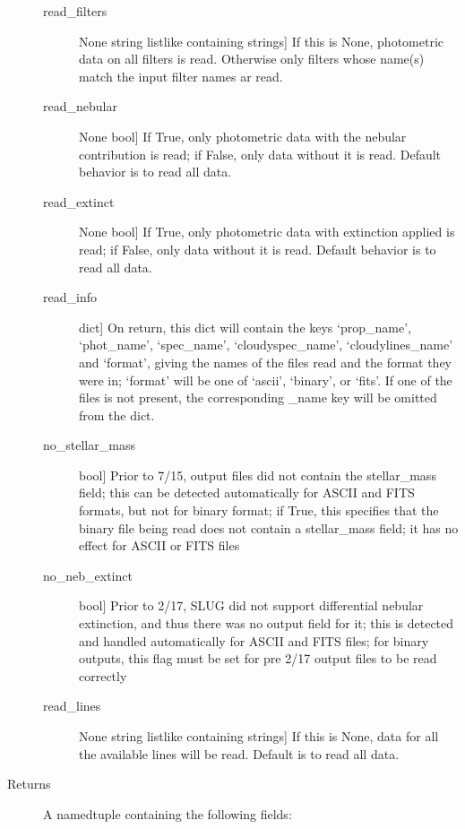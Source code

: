 \documentclass[letterpaper,10pt,english]{sphinxmanual}
\begin{document}
\begin{fulllineitems}
\begin{description}
\begin{description}
\item[{read\_filters}] \leavevmode{[}None \textbar{} string \textbar{} listlike containing strings{]}
If this is None, photometric data on all filters is
read. Otherwise only filters whose name(s) match the input
filter names ar read.

\item[{read\_nebular}] \leavevmode{[}None \textbar{} bool{]}
If True, only photometric data with the nebular contribution
is read; if False, only data without it is read. Default
behavior is to read all data.

\item[{read\_extinct}] \leavevmode{[}None \textbar{} bool{]}
If True, only photometric data with extinction applied is
read; if False, only data without it is read. Default
behavior is to read all data.

\item[{read\_info}] \leavevmode{[}dict{]}
On return, this dict will contain the keys ‘prop\_name’,
‘phot\_name’, ‘spec\_name’, ‘cloudyspec\_name’, ‘cloudylines\_name’
and ‘format’, giving the names of the files read and the format
they were in; ‘format’ will be one of ‘ascii’, ‘binary’, or
‘fits’. If one of the files is not present, the corresponding
\_name key will be omitted from the dict.

\item[{no\_stellar\_mass}] \leavevmode{[}bool{]}
Prior to 7/15, output files did not contain the stellar\_mass
field; this can be detected automatically for ASCII and FITS
formats, but not for binary format; if True, this specifies
that the binary file being read does not contain a
stellar\_mass field; it has no effect for ASCII or FITS files

\item[{no\_neb\_extinct}] \leavevmode{[}bool{]}
Prior to 2/17, SLUG did not support differential nebular
extinction, and thus there was no output field for it; this
is detected and handled automatically for ASCII and FITS
files; for binary outputs, this flag must be set for pre
2/17 output files to be read correctly

\item[{read\_lines}] \leavevmode{[}None \textbar{} string \textbar{} listlike containing strings{]}
If this is None, data for all the available lines will be 
read. Default is to read all data.

\end{description}

\item[{Returns}] \leavevmode
A namedtuple containing the following fields:


\end{description}
\end{fulllineitems}
\end{document}
